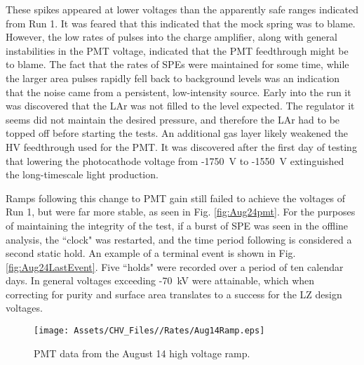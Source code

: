 These spikes appeared at lower voltages than the apparently safe ranges indicated from Run 1.
It was feared that this indicated that the mock spring was to blame.
However, the low rates of pulses into the charge amplifier, along with general instabilities in the PMT voltage, indicated that the PMT feedthrough might be to blame.
The fact that the rates of SPEs were maintained for some time, while the larger area pulses rapidly fell back to background levels was an indication that the noise came from a persistent, low-intensity source.
Early into the run it was discovered that the LAr was not filled to the level expected.
The regulator it seems did not maintain the desired pressure, and therefore the LAr had to be topped off before starting the tests.
An additional gas layer likely weakened the HV feedthrough used for the PMT.
It was discovered after the first day of testing that lowering the photocathode voltage from -1750~V to -1550~V extinguished the long-timescale light production.

Ramps following this change to PMT gain still failed to achieve the voltages of Run 1, but were far more stable, as seen in Fig. \ref{fig:Aug24pmt}.
For the purposes of maintaining the integrity of the test, if a burst of SPE was seen in the offline analysis, the ``clock" was restarted, and the time period following is considered a second static hold.
An example of a terminal event is shown in Fig. \ref{fig:Aug24LastEvent}.
Five ``holds" were recorded over a period of ten calendar days.
In general voltages exceeding -70~kV were attainable, which when correcting for purity and surface area translates to a success for the LZ design voltages.

\begin{figure}
\begin{center}
\texttt{[image: Assets/CHV\_Files//Rates/Aug14Ramp.eps]}
\end{center}
\caption[PMT  data from the CHV - August 14 high voltage ramp.]%
{PMT  data from the August 14 high voltage ramp.}
\label{fig:aug14_ramp}
\end{figure}



